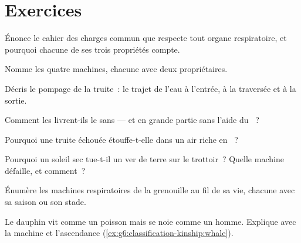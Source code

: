 \section{Exercices}

\begin{exercise}[$\star$]\label{exo:g7:how-animals-breathe:1}
Énonce le cahier des charges commun que respecte tout organe
respiratoire, et pourquoi chacune de ses trois propriétés compte.
\end{exercise}

\begin{exercise}[$\star$]\label{exo:g7:how-animals-breathe:2}
Nomme les quatre machines, chacune avec deux propriétaires.
\end{exercise}

\begin{exercise}[$\star$]\label{exo:g7:how-animals-breathe:3}
Décris le pompage de la truite~: le trajet de l'eau à l'entrée, à
la traversée et à la sortie.
\end{exercise}

\begin{exercise}[$\star$]\label{exo:g7:how-animals-breathe:4}
Comment les  livrent-ils le  sans  --- et
en grande partie sans l'aide du ~?
\end{exercise}

\begin{exercise}[$\star$]\label{exo:g7:how-animals-breathe:5}
Pourquoi une truite échouée étouffe-t-elle dans un air riche en
~?
\end{exercise}

\begin{exercise}[$\star$]\label{exo:g7:how-animals-breathe:6}
Pourquoi un soleil sec tue-t-il un ver de terre sur le trottoir~?
Quelle machine défaille, et comment~?
\end{exercise}

\begin{exercise}[$\star\star$]\label{exo:g7:how-animals-breathe:7}
Énumère les machines respiratoires de la grenouille au fil de sa
vie, chacune avec sa saison ou son stade.
\end{exercise}

\begin{exercise}[$\star\star$]\label{exo:g7:how-animals-breathe:8}
Le dauphin vit comme un poisson mais se noie comme un homme.
Explique avec la machine et l'ascendance
(\cref{ex:g6:classification-kinship:whale}).
\end{exercise}

